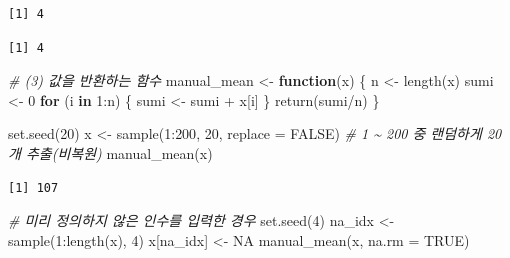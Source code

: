 \documentclass[
  11pt,
]{krantz}
\newenvironment{Shaded}{\begin{snugshade}}{\end{snugshade}}
\newcommand{\AttributeTok}[1]{\textcolor[rgb]{0.61,0.61,0.61}{#1}}
\newcommand{\CommentTok}[1]{\textcolor[rgb]{0.37,0.37,0.37}{\textit{#1}}}
\newcommand{\ConstantTok}[1]{\textcolor[rgb]{0,0,0}{#1}}
\newcommand{\ControlFlowTok}[1]{\textcolor[rgb]{0.27,0.27,0.27}{\textbf{#1}}}
\newcommand{\DecValTok}[1]{\textcolor[rgb]{0.06,0.06,0.06}{#1}}
\newcommand{\FunctionTok}[1]{\textcolor[rgb]{0,0,0}{#1}}
\newcommand{\NormalTok}[1]{#1}
\newcommand{\OtherTok}[1]{\textcolor[rgb]{0.37,0.37,0.37}{#1}}
\newcommand{\SpecialCharTok}[1]{\textcolor[rgb]{0,0,0}{#1}}
\begin{document}
\begin{verbatim}
[1] 4
\end{verbatim}

\begin{verbatim}
[1] 4
\end{verbatim}

\normalsize

\footnotesize

\begin{Shaded}
\begin{Highlighting}[]
\CommentTok{\# (3) 값을 반환하는 함수}
\NormalTok{manual\_mean }\OtherTok{\textless{}{-}} \ControlFlowTok{function}\NormalTok{(x) \{}
\NormalTok{  n }\OtherTok{\textless{}{-}} \FunctionTok{length}\NormalTok{(x)}
\NormalTok{  sumi }\OtherTok{\textless{}{-}} \DecValTok{0}
  \ControlFlowTok{for}\NormalTok{ (i }\ControlFlowTok{in} \DecValTok{1}\SpecialCharTok{:}\NormalTok{n) \{}
\NormalTok{    sumi }\OtherTok{\textless{}{-}}\NormalTok{ sumi }\SpecialCharTok{+}\NormalTok{ x[i]}
\NormalTok{  \}}
  \FunctionTok{return}\NormalTok{(sumi}\SpecialCharTok{/}\NormalTok{n) }
\NormalTok{\}}

\FunctionTok{set.seed}\NormalTok{(}\DecValTok{20}\NormalTok{)}
\NormalTok{x }\OtherTok{\textless{}{-}} \FunctionTok{sample}\NormalTok{(}\DecValTok{1}\SpecialCharTok{:}\DecValTok{200}\NormalTok{, }\DecValTok{20}\NormalTok{, }\AttributeTok{replace =} \ConstantTok{FALSE}\NormalTok{) }\CommentTok{\# 1 \textasciitilde{} 200 중 랜덤하게 20개 추출(비복원)}
\FunctionTok{manual\_mean}\NormalTok{(x)}
\end{Highlighting}
\end{Shaded}

\begin{verbatim}
[1] 107
\end{verbatim}

\begin{Shaded}
\begin{Highlighting}[]
\CommentTok{\# 미리 정의하지 않은 인수를 입력한 경우}
\FunctionTok{set.seed}\NormalTok{(}\DecValTok{4}\NormalTok{)}
\NormalTok{na\_idx }\OtherTok{\textless{}{-}} \FunctionTok{sample}\NormalTok{(}\DecValTok{1}\SpecialCharTok{:}\FunctionTok{length}\NormalTok{(x), }\DecValTok{4}\NormalTok{)}
\NormalTok{x[na\_idx] }\OtherTok{\textless{}{-}} \ConstantTok{NA}
\FunctionTok{manual\_mean}\NormalTok{(x, }\AttributeTok{na.rm =} \ConstantTok{TRUE}\NormalTok{)}
\end{Highlighting}
\end{Shaded}
\end{document}
